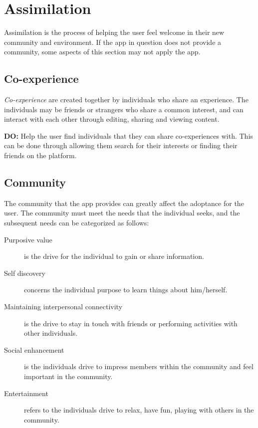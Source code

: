 \section{Assimilation}
Assimilation is the process of helping the user feel welcome in their new community and environment. If the app in question does not provide a community, some aspects of this section may not apply the app.

\subsection{Co-experience}

\textit{Co-experience} are created together by individuals who share an experience. The individuals may be friends or strangers who share a common interest, and can interact with each other through editing, sharing and viewing content.

\begin{displayquote}
  \textbf{DO:} Help the user find individuals that they can share co-experiences with. This can be done through allowing them search for their interests or finding their friends on the platform.
\end{displayquote}

\subsection{Community}

The community that the app provides can greatly affect the adoptance for the user. The community must meet the needs that the individual seeks, and the subsequent needs can be categorized as follows:

\begin{description}
  \item[Purposive value] is the drive for the individual to gain or share information.
  \item[Self discovery] concerns the individual purpose to learn things about him/herself.
  \item[Maintaining interpersonal connectivity] is the drive to stay in touch with friends or performing activities with other individuals.
  \item[Social enhancement] is the individuals drive to impress members within the community and feel important in the community.
  \item[Entertainment] refers to the individuals drive to relax, have fun, playing with others in the community.
\end{description}

